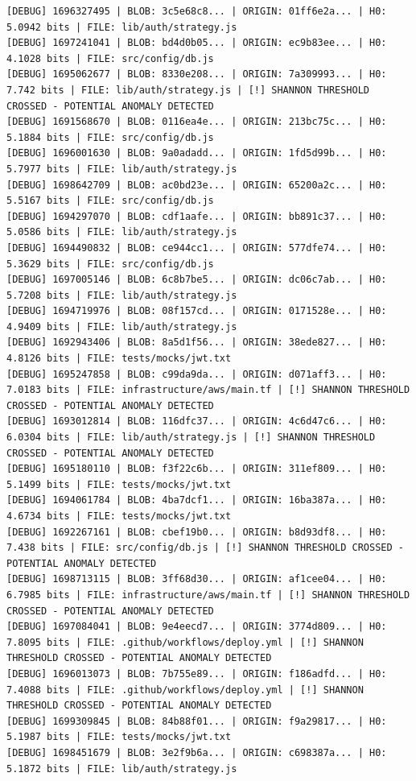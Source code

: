 \documentclass[12pt, a4paper, oneside]{report}
\begin{document}
\begin{lstlisting}[basicstyle=\tiny\ttfamily]
[DEBUG] 1696327495 | BLOB: 3c5e68c8... | ORIGIN: 01ff6e2a... | H0: 5.0942 bits | FILE: lib/auth/strategy.js
[DEBUG] 1697241041 | BLOB: bd4d0b05... | ORIGIN: ec9b83ee... | H0: 4.1028 bits | FILE: src/config/db.js
[DEBUG] 1695062677 | BLOB: 8330e208... | ORIGIN: 7a309993... | H0: 7.742 bits | FILE: lib/auth/strategy.js | [!] SHANNON THRESHOLD CROSSED - POTENTIAL ANOMALY DETECTED
[DEBUG] 1691568670 | BLOB: 0116ea4e... | ORIGIN: 213bc75c... | H0: 5.1884 bits | FILE: src/config/db.js
[DEBUG] 1696001630 | BLOB: 9a0adadd... | ORIGIN: 1fd5d99b... | H0: 5.7977 bits | FILE: lib/auth/strategy.js
[DEBUG] 1698642709 | BLOB: ac0bd23e... | ORIGIN: 65200a2c... | H0: 5.5167 bits | FILE: src/config/db.js
[DEBUG] 1694297070 | BLOB: cdf1aafe... | ORIGIN: bb891c37... | H0: 5.0586 bits | FILE: lib/auth/strategy.js
[DEBUG] 1694490832 | BLOB: ce944cc1... | ORIGIN: 577dfe74... | H0: 5.3629 bits | FILE: src/config/db.js
[DEBUG] 1697005146 | BLOB: 6c8b7be5... | ORIGIN: dc06c7ab... | H0: 5.7208 bits | FILE: lib/auth/strategy.js
[DEBUG] 1694719976 | BLOB: 08f157cd... | ORIGIN: 0171528e... | H0: 4.9409 bits | FILE: lib/auth/strategy.js
[DEBUG] 1692943406 | BLOB: 8a5d1f56... | ORIGIN: 38ede827... | H0: 4.8126 bits | FILE: tests/mocks/jwt.txt
[DEBUG] 1695247858 | BLOB: c99da9da... | ORIGIN: d071aff3... | H0: 7.0183 bits | FILE: infrastructure/aws/main.tf | [!] SHANNON THRESHOLD CROSSED - POTENTIAL ANOMALY DETECTED
[DEBUG] 1693012814 | BLOB: 116dfc37... | ORIGIN: 4c6d47c6... | H0: 6.0304 bits | FILE: lib/auth/strategy.js | [!] SHANNON THRESHOLD CROSSED - POTENTIAL ANOMALY DETECTED
[DEBUG] 1695180110 | BLOB: f3f22c6b... | ORIGIN: 311ef809... | H0: 5.1499 bits | FILE: tests/mocks/jwt.txt
[DEBUG] 1694061784 | BLOB: 4ba7dcf1... | ORIGIN: 16ba387a... | H0: 4.6734 bits | FILE: tests/mocks/jwt.txt
[DEBUG] 1692267161 | BLOB: cbef19b0... | ORIGIN: b8d93df8... | H0: 7.438 bits | FILE: src/config/db.js | [!] SHANNON THRESHOLD CROSSED - POTENTIAL ANOMALY DETECTED
[DEBUG] 1698713115 | BLOB: 3ff68d30... | ORIGIN: af1cee04... | H0: 6.7985 bits | FILE: infrastructure/aws/main.tf | [!] SHANNON THRESHOLD CROSSED - POTENTIAL ANOMALY DETECTED
[DEBUG] 1697084041 | BLOB: 9e4eecd7... | ORIGIN: 3774d809... | H0: 7.8095 bits | FILE: .github/workflows/deploy.yml | [!] SHANNON THRESHOLD CROSSED - POTENTIAL ANOMALY DETECTED
[DEBUG] 1696013073 | BLOB: 7b755e89... | ORIGIN: f186adfd... | H0: 7.4088 bits | FILE: .github/workflows/deploy.yml | [!] SHANNON THRESHOLD CROSSED - POTENTIAL ANOMALY DETECTED
[DEBUG] 1699309845 | BLOB: 84b88f01... | ORIGIN: f9a29817... | H0: 5.1987 bits | FILE: tests/mocks/jwt.txt
[DEBUG] 1698451679 | BLOB: 3e2f9b6a... | ORIGIN: c698387a... | H0: 5.1872 bits | FILE: lib/auth/strategy.js
\end{lstlisting}
\end{document}
